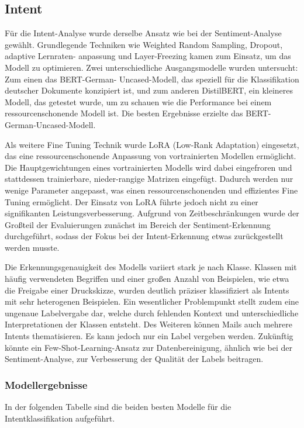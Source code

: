 \subsection{Intent} 
Für die Intent-Analyse wurde derselbe Ansatz wie bei der Sentiment-Analyse gewählt. 
Grundlegende Techniken wie Weighted Random Sampling, Dropout, adaptive Lernraten- anpassung 
und Layer-Freezing kamen zum Einsatz, um das Modell zu optimieren. Zwei unterschiedliche 
Ausgangsmodelle wurden untersucht: Zum einen das BERT-German- Uncased-Modell, das speziell 
für die Klassifikation deutscher Dokumente konzipiert ist, und zum anderen DistilBERT, 
ein kleineres Modell, das getestet wurde, um zu schauen wie die Performance bei einem 
ressourcenschonende Modell ist. Die besten Ergebnisse erzielte das BERT-German-Uncased-Modell. 

Als weitere Fine Tuning Technik wurde LoRA (Low-Rank Adaptation) eingesetzt, das eine 
ressourcenschonende Anpassung von vortrainierten Modellen ermöglicht. Die Hauptgewichtungen 
eines vortrainierten Modells wird dabei eingefroren und stattdessen trainierbare, nieder-rangige Matrizen 
eingefügt. Dadurch werden nur wenige Parameter angepasst, was einen ressourcenschonenden und effizientes 
Fine Tuning ermöglicht. Der Einsatz von LoRA führte jedoch nicht zu einer signifikanten 
Leistungsverbesserung. Aufgrund von Zeitbeschränkungen wurde der Großteil der Evaluierungen zunächst 
im Bereich der Sentiment-Erkennung durchgeführt, sodass der Fokus bei der Intent-Erkennung etwas 
zurückgestellt werden musste. 

Die Erkennungsgenauigkeit des Modells variiert stark je nach Klasse. Klassen mit häufig verwendeten 
Begriffen und einer großen Anzahl von Beispielen, wie etwa die Freigabe einer Druckskizze, 
wurden deutlich präziser klassifiziert als Intents mit sehr heterogenen Beispielen. 
Ein wesentlicher Problempunkt stellt zudem eine ungenaue Labelvergabe dar, welche durch 
fehlenden Kontext und unterschiedliche Interpretationen der Klassen entsteht. Des Weiteren können 
Mails auch mehrere Intents thematisieren. Es kann jedoch nur ein Label vergeben werden. 
Zukünftig könnte ein Few-Shot-Learning-Ansatz zur Datenbereinigung, ähnlich wie bei der 
Sentiment-Analyse, zur Verbesserung der Qualität der Labels beitragen. 
\newpage
\subsubsection{Modellergebnisse}
In der folgenden Tabelle sind die beiden besten Modelle für die Intentklassifikation
aufgeführt. 

